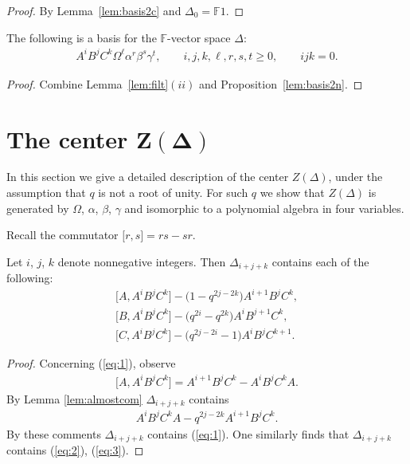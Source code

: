 \begin{proof}
By Lemma~\ref{lem:basis2c} and
$\Delta_0=\mathbb F 1$.
\end{proof}




\begin{Theorem}
\label{lem:basis2}
The following is a basis for the $\mathbb F$-vector space
$\Delta$:
\begin{gather*}
A^iB^jC^k\Omega^\ell \alpha^r \beta^s \gamma^t, \qquad
i,j,k,\ell, r,s,t\geq 0,
 \qquad ijk=0.
\end{gather*}
\end{Theorem}

\begin{proof}
Combine
Lemma~\ref{lem:filt}$(ii)$
and
Proposition~\ref{lem:basis2n}.
\end{proof}







\section[The center $Z(\Delta)$]{The center $\boldsymbol{Z(\Delta)}$}

In this section we give a detailed description of
the center $Z(\Delta)$, under the assumption that $q$ is not a root of
 unity.
For such $q$ we show that $Z(\Delta)$ is generated by
$\Omega$, $\alpha$, $\beta$, $\gamma$ and
 isomorphic to a polynomial algebra in four
variables.

  Recall the commutator
 $\lbrack r,s\rbrack=rs-sr$.


\begin{Lemma}
\label{lem:ijk}
Let
$i$, $j$, $k$
denote nonnegative integers.
Then $\Delta_{i+j+k}$ contains each of the fol\-lo\-wing:
\begin{gather}
\label{eq:1}
 \big\lbrack A,A^iB^jC^k\big\rbrack - \big(1-q^{2j-2k}\big)A^{i+1}B^jC^k,
\\
\label{eq:2}
 \big\lbrack B,A^iB^jC^k\big\rbrack - \big(q^{2i}-q^{2k}\big)A^iB^{j+1}C^k,
\\
\label{eq:3}
 \big\lbrack C,A^iB^jC^k\big\rbrack - \big(q^{2j-2i}-1\big)A^iB^jC^{k+1}.
\end{gather}
\end{Lemma}

\begin{proof}
Concerning (\ref{eq:1}), observe
\begin{gather*}
\big\lbrack A,A^iB^jC^k\big\rbrack = A^{i+1}B^jC^k -A^iB^jC^kA.
\end{gather*}
By Lemma
\ref{lem:almostcom} $\Delta_{i+j+k}$ contains
\begin{gather*}
A^iB^jC^kA - q^{2j-2k}A^{i+1}B^jC^k.
\end{gather*}
By these comments
$\Delta_{i+j+k}$ contains
(\ref{eq:1}).
One similarly f\/inds that
$\Delta_{i+j+k}$ contains
(\ref{eq:2}),
(\ref{eq:3}).
\end{proof}


